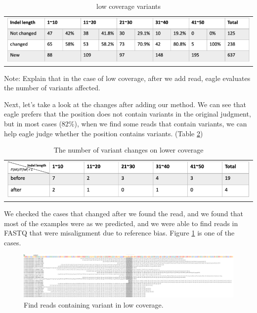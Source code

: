 \vspace{1cm}
\begin{table}[h]
    \centering
    \caption[low coverage variants]{low coverage variants}
    \vspace{-0.5cm}
    \begin{tabular}{c}
        \includegraphics[width=1\textwidth]{body/image/t4-2.png}
    \end{tabular}
    \label{t4-2}
    {Note: Explain that in the case of low coverage, after we add read, eagle evaluates the number of variants affected.}
\end{table}

Next, let’s take a look at the changes after adding our method. We can see that eagle prefers that the position does not contain variants in the original judgment, but in most cases (82\%), when we find some reads that contain variants, we can help eagle judge whether the position contains variants. (Table \ref{t4-3})

\vspace{1cm}
\begin{center}
\begin{table}[h]
    \centering
    \caption{The number of variant changes on lower coverage}
    \vspace{-0.5cm}
    \begin{tabular}{c}
        \includegraphics[width=1\textwidth]{body/image/t4-3.png}
    \end{tabular}
    \label{t4-3}
\end{table}
\end{center}

We checked the cases that changed after we found the read, and we found that most of the examples were as we predicted, and we were able to find reads in FASTQ that were misalignment due to reference bias. Figure \ref{f4-3} is one of the cases.

\vspace{1cm}
\begin{figure}[H]
    \centering
    \includegraphics[width=1\columnwidth]{body/image/4-3.png}
    \captionsetup{labelfont=bf}
    \renewcommand{\baselinestretch}{1.0}
    \vspace{-1cm}
    \caption[Find variant reads in low coverage]{Find reads containing variant in low coverage.}
    \label{f4-3}
\end{figure}


